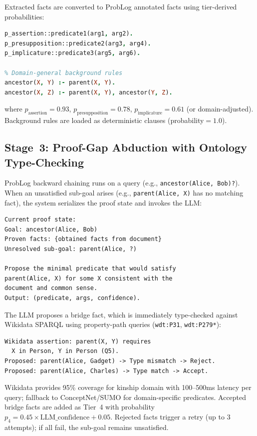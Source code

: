 \documentclass[11pt,letterpaper]{article}
\begin{document}
Extracted facts are converted to ProbLog annotated facts using tier-derived probabilities:

\begin{lstlisting}[language=Prolog]
p_assertion::predicate1(arg1, arg2).
p_presupposition::predicate2(arg3, arg4).
p_implicature::predicate3(arg5, arg6).

% Domain-general background rules
ancestor(X, Y) :- parent(X, Y).
ancestor(X, Z) :- parent(X, Y), ancestor(Y, Z).
\end{lstlisting}

where $p_{\text{assertion}}=0.93$, $p_{\text{presupposition}}=0.78$, $p_{\text{implicature}}=0.61$ (or domain-adjusted). Background rules are loaded as deterministic clauses (probability$=1.0$).

\subsection{Stage~3: Proof-Gap Abduction with Ontology Type-Checking}

ProbLog backward chaining runs on a query (e.g., \texttt{ancestor(Alice, Bob)?}). When an unsatisfied sub-goal arises (e.g., \texttt{parent(Alice, X)} has no matching fact), the system serializes the proof state and invokes the LLM:

\begin{lstlisting}
Current proof state:
Goal: ancestor(Alice, Bob)
Proven facts: {obtained facts from document}
Unresolved sub-goal: parent(Alice, ?)

Propose the minimal predicate that would satisfy
parent(Alice, X) for some X consistent with the
document and common sense.
Output: (predicate, args, confidence).
\end{lstlisting}

The LLM proposes a bridge fact, which is immediately type-checked against Wikidata SPARQL using property-path queries (\texttt{wdt:P31}, \texttt{wdt:P279*}):

\begin{lstlisting}
Wikidata assertion: parent(X, Y) requires
  X in Person, Y in Person (Q5).
Proposed: parent(Alice, Gadget) -> Type mismatch -> Reject.
Proposed: parent(Alice, Charles) -> Type match -> Accept.
\end{lstlisting}

Wikidata \citep{Wikidata2025} provides 95\% coverage for kinship domain with 100--500ms latency per query; fallback to ConceptNet/SUMO for domain-specific predicates. Accepted bridge facts are added as Tier~4 with probability $p_4=0.45 \times \text{LLM\_confidence} + 0.05$. Rejected facts trigger a retry (up to 3 attempts); if all fail, the sub-goal remains unsatisfied.
\end{document}
